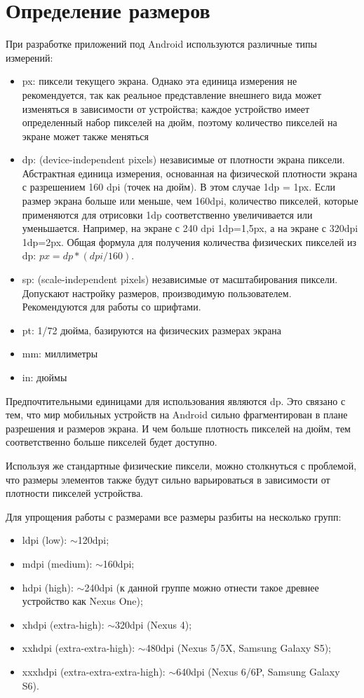 \section{Определение размеров}
При разработке приложений под Android используются различные
типы измерений:
\begin{itemize}
	\item px: пиксели текущего экрана. Однако эта единица измерения не
		рекомендуется, так как реальное представление внешнего вида
		может изменяться в зависимости от устройства; каждое устройство
		имеет определенный набор пикселей на дюйм, поэтому количество
		пикселей на экране может также меняться
	\item dp: (device-independent pixels) независимые от плотности экрана
		пиксели. Абстрактная единица измерения, основанная на физической
		плотности экрана с разрешением 160 dpi (точек на дюйм).
		В этом случае 1dp = 1px. Если размер экрана больше или меньше,
		чем 160dpi, количество пикселей, которые применяются
		для отрисовки 1dp соответственно увеличивается или уменьшается.
		Например, на экране с 240 dpi 1dp=1,5px, а на экране с 320dpi 1dp=2px.
		Общая формула для получения количества физических пикселей
		из dp: \( px = dp * (dpi / 160) \).
	\item sp: (scale-independent pixels) независимые от масштабирования
		пиксели. Допускают настройку размеров, производимую
		пользователем. Рекомендуются для работы со шрифтами.
	\item pt: 1/72 дюйма, базируются на физических размерах экрана
	\item mm: миллиметры
	\item in: дюймы
\end{itemize}

Предпочтительными единицами для использования являются dp. Это связано
с тем, что мир мобильных устройств на Android сильно фрагментирован в
плане разрешения и размеров экрана. И чем больше плотность пикселей на
дюйм, тем соответственно больше пикселей будет доступно.\par
Используя же стандартные физические пиксели, можно столкнуться с
проблемой, что размеры элементов также будут сильно варьироваться в
зависимости от плотности пикселей устройства.\par
Для упрощения работы с размерами все размеры разбиты на несколько
групп:
\begin{itemize}
	\item ldpi (low): $\sim$120dpi;
	\item mdpi (medium): $\sim$160dpi;
	\item hdpi (high):
		$\sim$240dpi (к данной группе можно отнести такое древнее
		устройство как Nexus One);
	\item xhdpi (extra-high): $\sim$320dpi (Nexus 4);
	\item xxhdpi (extra-extra-high):
		$\sim$480dpi (Nexus 5/5X, Samsung Galaxy S5);
	\item xxxhdpi (extra-extra-extra-high):
		$\sim$640dpi (Nexus 6/6P, Samsung Galaxy S6).
\end{itemize}

